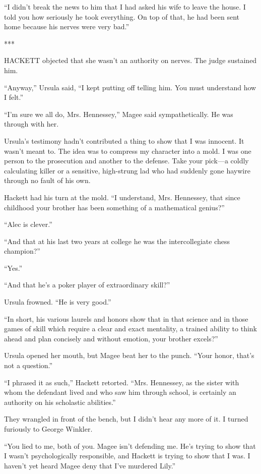 \documentclass{novel}
\begin{document}
“I didn’t break the news to him that I had asked his wife to leave the house. I told you how seriously he took everything. On top of that, he had been sent home because his nerves were very bad.”

***

HACKETT objected that she wasn’t an authority on nerves. The judge sustained him.

“Anyway,” Ursula said, “I kept putting off telling him. You must understand how I felt.”

“I’m sure we all do, Mrs. Hennessey,” Magee said sympathetically. He was through with her.

Ursula’s testimony hadn’t contributed a thing to show that I was innocent. It wasn’t meant to. The idea was to compress my character into a mold. I was one person to the prosecution and another to the defense. Take your pick—a coldly calculating killer or a sensitive, high-strung lad who had suddenly gone haywire through no fault of his own.

Hackett had his turn at the mold. “I understand, Mrs. Hennessey, that since childhood your brother has been something of a mathematical genius?”

“Alec is clever.”

“And that at his last two years at college he was the intercollegiate chess champion?”

“Yes.”

“And that he’s a poker player of extraordinary skill?”

Ursula frowned. “He is very good.”

“In short, his various laurels and honors show that in that science and in those games of skill which require a clear and exact mentality, a trained ability to think ahead and plan concisely and without emotion, your brother excels?”

Ursula opened her mouth, but Magee beat her to the punch. “Your honor, that’s not a question.”

“I phrased it as such,” Hackett retorted. “Mrs. Hennessey, as the sister with whom the defendant lived and who saw him through school, is certainly an authority on his scholastic abilities.”

They wrangled in front of the bench, but I didn’t hear any more of it. I turned furiously to George Winkler.

“You lied to me, both of you. Magee isn’t defending me. He’s trying to show that I wasn’t psychologically responsible, and Hackett is trying to show that I was. I haven’t yet heard Magee deny that I’ve murdered Lily.”
\end{document}
